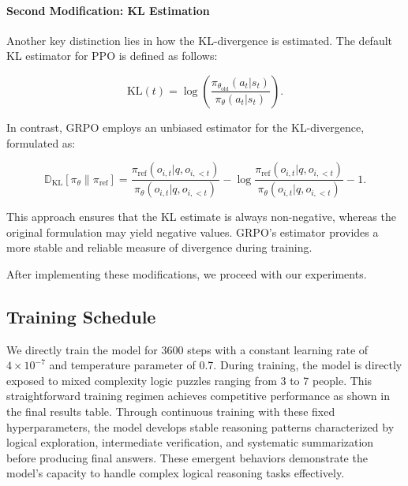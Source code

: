 \paragraph{Second Modification: KL Estimation}

Another key distinction lies in how the KL-divergence is estimated. The default KL estimator for PPO is defined as follows:

\begin{equation*}
\text{KL}(t) = \log\left(\frac{\pi_{\theta_{\text{old}}}(a_t | s_t)}{\pi_{\theta}(a_t | s_t)}\right).
\end{equation*}

In contrast, GRPO employs an unbiased estimator for the KL-divergence, formulated as:

\begin{equation*}
\mathbb{D}_{\text{KL}}\left[\pi_{\theta} \| \pi_{\text{ref}}\right] = \frac{\pi_{\text{ref}}\left(o_{i, t} | q, o_{i,<t}\right)}{\pi_{\theta}\left(o_{i, t} | q, o_{i,<t}\right)} - \log \frac{\pi_{\text{ref}}\left(o_{i, t} | q, o_{i,<t}\right)}{\pi_{\theta}\left(o_{i, t} | q, o_{i,<t}\right)} - 1.
\end{equation*}

This approach ensures that the KL estimate is always non-negative, whereas the original formulation may yield negative values. GRPO's estimator provides a more stable and reliable measure of divergence during training.

After implementing these modifications, we proceed with our experiments.


\subsection{Training Schedule}
We directly train the model for 3600 steps with a constant learning rate of $4 \times 10^{-7}$ and temperature parameter of 0.7. During training, the model is directly exposed to mixed complexity logic puzzles ranging from 3 to 7 people. This straightforward training regimen achieves competitive performance as shown in the final results table. Through continuous training with these fixed hyperparameters, the model develops stable reasoning patterns characterized by logical exploration, intermediate verification, and systematic summarization before producing final answers. These emergent behaviors demonstrate the model's capacity to handle complex logical reasoning tasks effectively.



